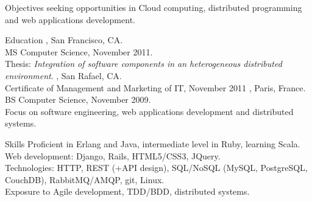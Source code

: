 \documentclass{resume}
\author{~~~~~~Edouard Swiac}
\begin{document}
\maketitle

\begin{category}{Objectives}
 seeking opportunities in Cloud computing, distributed programming and web applications development.
\end{category}


\begin{category}{Education}
, San Francisco, CA.
\\MS Computer Science, November 2011.
\\Thesis: \emph{Integration of software components in an heterogeneous distributed environment}.
, San Rafael, CA.
\\Certificate of Management and Marketing of IT, November 2011
, Paris, France.
\\BS Computer Science, November 2009.
\\Focus on software engineering, web applications development and distributed systems.
\end{category}


\begin{category}{Skills}
\citemnobullet 
Proficient in Erlang and Java, intermediate level in Ruby, learning Scala.
\\Web development: Django, Rails, HTML5/CSS3, JQuery.
\\Technologies: HTTP, REST (+API design), SQL/NoSQL (MySQL, PostgreSQL, CouchDB), RabbitMQ/AMQP, git, Linux.
\\Exposure to Agile development, TDD/BDD, distributed systems.
\end{category}
\end{document}
